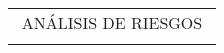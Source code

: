 \begin{adjustbox}{angle=90, captionbelow={DFMEA.}, float={table}}



\setlength\arrayrulewidth{0.5pt}
\centering
\begin{tabular}{|ccccccccllllc|}
\hline
\multicolumn{13}{|c|}{ANÁLISIS DE RIESGOS}                                                                                                                                                                                                                                                                                                                                                                                                                                                                                                                                                                                                                                                                                                                                                                                                                                                                                                                     \\
\multicolumn{1}{|l}{}                                           & \multicolumn{1}{l}{}                                                                                                   & \multicolumn{1}{l}{}                                                                                                   & \multicolumn{1}{l}{}                                                                                                     & \multicolumn{1}{l}{}                         & \multicolumn{1}{l}{}                         & \multicolumn{1}{l}{}                         & \multicolumn{1}{l}{}                            &                                                                                                                           &                                              &                                              &                                              & \multicolumn{1}{l|}{}                   \\ \cline{2-8}

\end{tabular}
\end{adjustbox}
